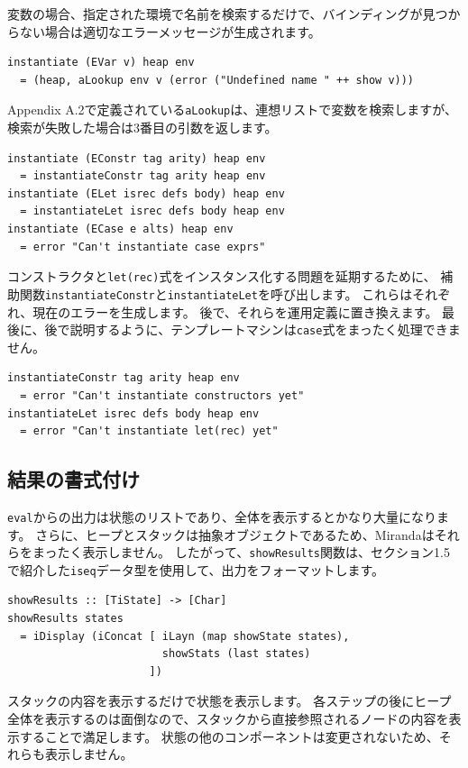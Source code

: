\documentclass{jbook}
\begin{document}
変数の場合、指定された環境で名前を検索するだけで、バインディングが見つからない場合は適切なエラーメッセージが生成されます。

\begin{verbatim}
instantiate (EVar v) heap env
  = (heap, aLookup env v (error ("Undefined name " ++ show v)))
\end{verbatim}

Appendix A.2で定義されている\texttt{aLookup}は、連想リストで変数を検索しますが、検索が失敗した場合は3番目の引数を返します。

\begin{verbatim}
instantiate (EConstr tag arity) heap env
  = instantiateConstr tag arity heap env
instantiate (ELet isrec defs body) heap env
  = instantiateLet isrec defs body heap env
instantiate (ECase e alts) heap env
  = error "Can't instantiate case exprs"
\end{verbatim}

コンストラクタと\texttt{let(rec)}式をインスタンス化する問題を延期するために、
補助関数\texttt{instantiateConstr}と\texttt{instantiateLet}を呼び出します。
これらはそれぞれ、現在のエラーを生成します。
後で、それらを運用定義に置き換えます。
最後に、後で説明するように、テンプレートマシンは\texttt{case}式をまったく処理できません。

\begin{verbatim}
instantiateConstr tag arity heap env
  = error "Can't instantiate constructors yet"
instantiateLet isrec defs body heap env
  = error "Can't instantiate let(rec) yet"
\end{verbatim}

\subsection{結果の書式付け}

\texttt{eval}からの出力は状態のリストであり、全体を表示するとかなり大量になります。
さらに、ヒープとスタックは抽象オブジェクトであるため、Mirandaはそれらをまったく表示しません。
したがって、\texttt{showResults}関数は、セクション1.5で紹介した\texttt{iseq}データ型を使用して、出力をフォーマットします。

\begin{verbatim}
showResults :: [TiState] -> [Char]
showResults states
  = iDisplay (iConcat [ iLayn (map showState states),
                        showStats (last states)
                      ])
\end{verbatim}

スタックの内容を表示するだけで状態を表示します。
各ステップの後にヒープ全体を表示するのは面倒なので、スタックから直接参照されるノードの内容を表示することで満足します。
状態の他のコンポーネントは変更されないため、それらも表示しません。
\end{document}
